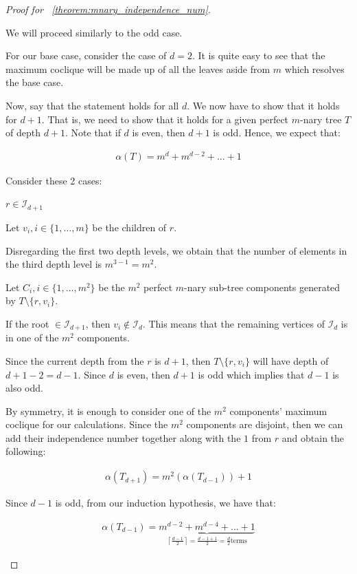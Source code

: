 \documentclass{amsart}
\theoremstyle{definition}
\begin{document}
\begin{proof}[Proof for ~\ref{theorem:mnary_independence_num}]
\begin{caseof}
		We will proceed similarly to the odd case.

		For our base case, consider the case of $d = 2$. It is quite easy to see that the maximum coclique will be made up of all the leaves aside from $m$ which resolves the base case.

		Now, say that the statement holds for all $d$. We now have to show that it holds for $d+1$. That is, we need to show that it holds for a given perfect $m$-nary tree $T$ of depth $d + 1$. Note that if $d$ is even, then $d + 1$ is odd. Hence, we expect that:

		\begin{align*}
			\alpha(T) = m^d + m^{d - 2} + \ldots + 1
		\end{align*}

		Consider these 2 cases:

		\begin{subcaseof}
			\item $r \in \mathcal{I}_{d + 1}$

			Let $v_i, i \in \{1, \dots, m\}$ be the children of $r$.

			Disregarding the first two depth levels, we obtain that the number of elements in the third depth level is $m^{3-1} = m^2$.

			Let $C_i, i \in \{1,\dots, m^2\}$ be the $m^2$ perfect $m$-nary sub-tree components generated by $T \setminus \{r, v_i\}$.

			If the root $\in \mathcal{I}_{d + 1}$, then $v_i \not\in \mathcal{I}_d$. This means that the remaining vertices of $\mathcal{I}_d$ is in one of the $m^2$ components.

			Since the current depth from the $r$ is $d + 1$, then $T \setminus \{r, v_i\}$ will have depth of $d + 1 - 2 = d - 1$. Since $d$ is even, then $d + 1$ is odd which implies that $d - 1$ is also odd.

			By symmetry, it is enough to consider one of the $m^2$ components' maximum coclique for our calculations. Since the $m^2$ components are disjoint, then we can add their independence number together along with the $1$ from $r$ and obtain the following:

			\begin{align*}
				\alpha(T_{d + 1}) = m^2(\alpha(T_{d - 1})) + 1
			\end{align*}

			Since $d - 1$ is odd, from our induction hypothesis, we have that:

			\begin{align*}
				\alpha(T_{d - 1}) = \underbrace{m^{d - 2} + m^{d - 4} + \dots + 1}_{\left\lceil\frac{d - 1}{2}\right\rceil = \frac{d - 1 + 1}{2} = \frac{d}{2} \text{terms}}
			\end{align*}


\end{subcaseof}
\end{caseof}
\end{proof}
\end{document}
